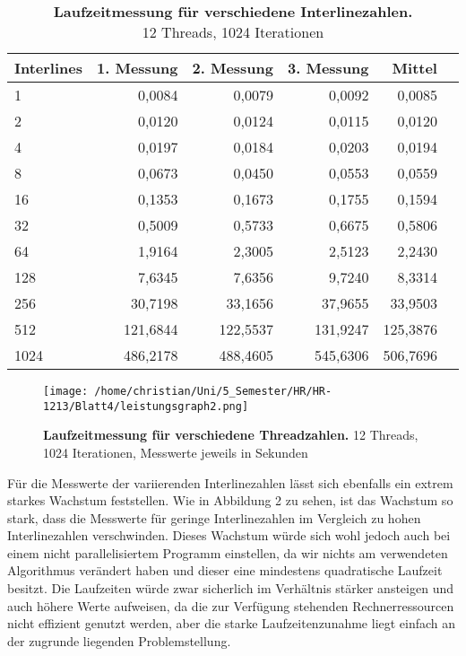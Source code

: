 \documentclass[a4paper,12pt]{scrartcl}
\begin{document}
\begin{table}[!h]
\begin{tabular}{|l|r|r|r|r|r|}
\hline
Interlines&1. Messung&2. Messung&3. Messung&Mittel\\
\hline
1&	0,0084	&0,0079	&0,0092	&0,0085\\
\hline
2&	0,0120	&0,0124	&0,0115	&0,0120\\
\hline
4&	0,0197	&0,0184	&0,0203	&0,0194\\
\hline
8&	0,0673	&0,0450	&0,0553	&0,0559\\
\hline
16&	0,1353	&0,1673	&0,1755	&0,1594\\
\hline
32&	0,5009	&0,5733	&0,6675	&0,5806\\
\hline
64&	1,9164	&2,3005	&2,5123	&2,2430\\
\hline
128&	7,6345	&7,6356	&9,7240	&8,3314\\
\hline
256&	30,7198	&33,1656	&37,9655	&33,9503\\
\hline
512&	121,6844	&122,5537	&131,9247	&125,3876\\
\hline
1024&	486,2178	&488,4605	&545,6306	&506,7696\\

\hline
\end{tabular}
\caption{\textbf{Laufzeitmessung für verschiedene Interlinezahlen.} \\12 Threads, 1024 Iterationen}
\end{table}
 


\begin{figure}[H]
\texttt{[image: /home/christian/Uni/5\_Semester/HR/HR-1213/Blatt4/leistungsgraph2.png]}
\caption{\textbf{Laufzeitmessung für verschiedene Threadzahlen.} 12 Threads,\\ 1024 Iterationen, Messwerte jeweils in Sekunden}
\end{figure}
Für die Messwerte der variierenden Interlinezahlen lässt sich ebenfalls ein extrem starkes Wachstum feststellen. Wie in Abbildung 2 zu sehen, ist das Wachstum so stark, dass die Messwerte für geringe Interlinezahlen im Vergleich zu hohen Interlinezahlen verschwinden. Dieses Wachstum würde sich wohl jedoch auch bei einem nicht parallelisiertem Programm einstellen, da wir nichts am verwendeten Algorithmus verändert haben und dieser eine mindestens quadratische Laufzeit besitzt. Die Laufzeiten würde zwar sicherlich im Verhältnis stärker ansteigen und auch höhere Werte aufweisen, da die zur Verfügung stehenden Rechnerressourcen nicht effizient genutzt werden, aber die starke Laufzeitenzunahme liegt einfach an der zugrunde liegenden Problemstellung.
\end{document}
